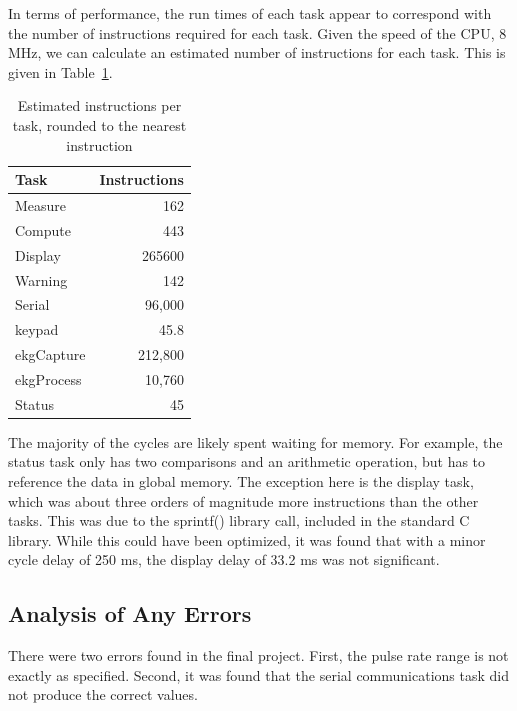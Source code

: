 \documentclass[12pt]{article} %
\begin{document}
    In terms of performance, the run times of each task appear to correspond with
    the number of instructions required for each task. Given the speed of the CPU,
    8 MHz, we can calculate an estimated number of instructions for each task.
    This is given in Table~\ref{tab:instr}.
    \begin{table}[h]
      \centering
      \begin{tabular}{|l|r|} 
	\hline
	Task & Instructions \\ \hline
	Measure & 162 \\ \hline
	Compute & 443 \\ \hline
	Display & 265600 \\ \hline
	Warning & 142 \\ \hline
    Serial & 96,000 \\ \hline
    keypad & 45.8 \\ \hline
    ekgCapture & 212,800 \\ \hline
    ekgProcess & 10,760 \\ \hline
	Status & 45 \\ \hline
      \end{tabular}
      \caption{Estimated instructions per task, rounded to the nearest instruction}
      \label{tab:instr}
    \end{table}
    The majority of the cycles are likely spent waiting for memory. For example,
    the status task only has two comparisons and an arithmetic operation, but has
    to reference the data in global memory. The exception here is the display
    task, which was about three orders of magnitude more instructions than the
    other tasks. This was due to the sprintf() library call, included in the
    standard C library. While this could have been optimized, it was found that
    with a minor cycle delay of 250 ms, the display delay of 33.2 ms was not
    significant.


    \subsection{Analysis of Any Errors}
    
    There were two errors found in the final project.  First, the pulse rate
    range is not exactly as specified.  Second, it was found that the serial
    communications task did not produce the correct values.
\end{document}
